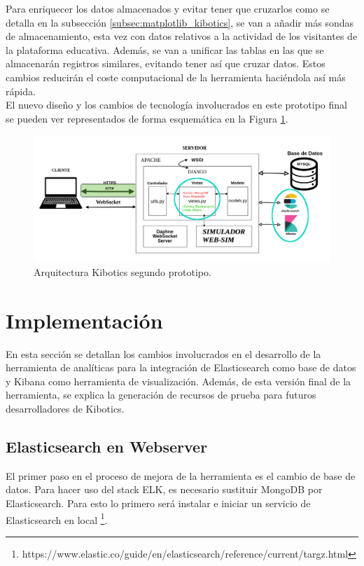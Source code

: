 \documentclass[a4paper, 12pt]{book}
\begin{document}
		Para enriquecer los datos almacenados y evitar tener que cruzarlos como se detalla en la subsección \ref{subsec:matplotlib_kibotics}, se van a añadir más sondas de almacenamiento, esta vez con datos relativos a la actividad de los visitantes de la plataforma educativa. Además, se van a unificar las tablas en las que se almacenarán registros similares, evitando tener así que cruzar datos. Estos cambios reducirán el coste computacional de la herramienta haciéndola así más rápida. \\
		
		El nuevo diseño y los cambios de tecnología involucrados en este prototipo final se pueden ver representados de forma esquemática en la Figura \ref{fig:arquitectura_kibotics_2}. 
		
		\begin{figure}[H]
			\centering
			\includegraphics[width=16cm, keepaspectratio]{img/esquema_Kibotics_2.png}
			\caption{Arquitectura Kibotics segundo prototipo.}
			\label{fig:arquitectura_kibotics_2}
		\end{figure}
	
	\section{Implementación} 
	\label{sec:2_implementacion} 
	
		En esta sección se detallan los cambios involucrados en el desarrollo de la herramienta de analíticas para la integración de Elasticsearch como base de datos y Kibana como herramienta de visualización. Además, de esta versión final de la herramienta, se explica la generación de recursos de prueba para futuros desarrolladores de Kibotics.
	\subsection{Elasticsearch en Webserver}
	\label{subsec:elasticsearch_kibotics}
	
		El primer paso en el proceso de mejora de la herramienta es el cambio de base de datos. Para hacer uso del stack ELK, es necesario sustituir MongoDB por Elasticsearch. Para esto lo primero será instalar e iniciar un servicio de Elasticsearch en local \footnote{https://www.elastic.co/guide/en/elasticsearch/reference/current/targz.html}.\\
				
\end{document}
